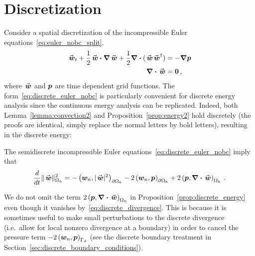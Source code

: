 \section{Discretization}%
\label{sec:discretization}
Consider a spatial discretization of the incompressible Euler equations~\eqref{eq:euler_nobc_split}.
\begin{subequations}%
\label{eq:discrete_euler_nobc}
  \begin{align}
    \wn_t + \frac{1}{2} \wn \cdotn \nablan \wn + \frac{1}{2} \divn (\wn \wn^\dagger) &= -\nablan \pn \label{eq:discrete_momentum} \\
    \divn \wn &= \zeron \,, \label{eq:discrete_divergence}
  \end{align}
\end{subequations}
where $\wn$ and $\bm{p}$ are time dependent grid functions. The form~\eqref{eq:discrete_euler_nobc} is particularly convenient for discrete energy analysis since the continuous energy analysis can be replicated. Indeed, both Lemma~\ref{lemma:convection2} and Proposition~\ref{prop:energy2} hold discretely (the proofs are identical, simply replace the normal letters by bold letters), resulting in the discrete energy:

\begin{proposition}\label{prop:discrete_energy}
  The semidiscrete incompressible Euler equations~\eqref{eq:discrete_euler_nobc} imply that
  \begin{equation}\label{eq:discrete_boundary_terms}
    \frac{d}{dt} \|\wn\|_{\Omega_h}^2
      = -\ipbnfull{\wnn}{|\wn|^2} - 2\ipbnfull{\wnn}{\pn} + 2\ipn{\pn}{\divn \wn}\,.
  \end{equation}
\end{proposition}
\begin{remark}
  We do not omit the term $2\ipn{\pn}{\divn \wn}$ in Proposition~\ref{prop:discrete_energy} even though it vanishes by~\eqref{eq:discrete_divergence}. This is because it is sometimes useful to make small perturbations to the discrete divergence (i.e.\ allow for local nonzero divergence at a boundary) in order to cancel the pressure term $-2\left(\bm{w}_n, \bm{p}\right)_{\Gamma_d}$ (see the discrete boundary treatment in Section~\ref{sec:discrete_boundary_conditions}).
\end{remark}

